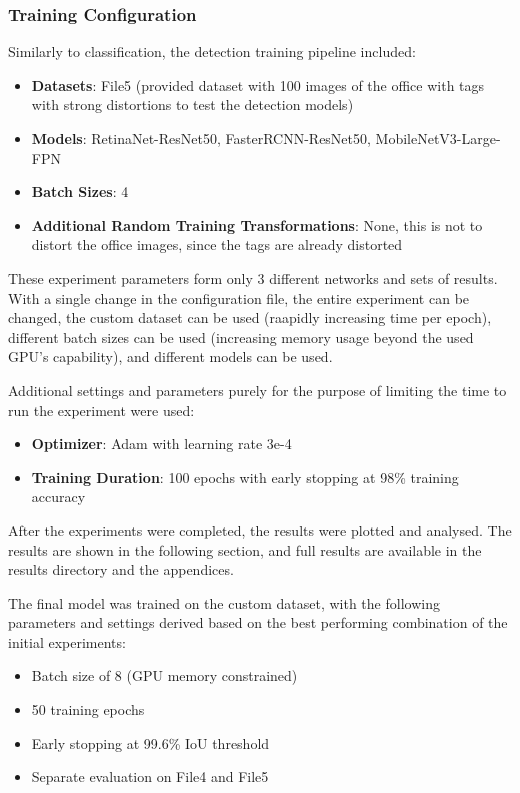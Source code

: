 \documentclass[conference]{IEEEtran}
\begin{document}
\subsubsection{Training Configuration}

Similarly to classification, the detection training pipeline included:

\begin{itemize}
  \item \textbf{Datasets}: File5 (provided dataset with 100 images of the office with tags with strong distortions to test the detection models)
  \item \textbf{Models}: RetinaNet-ResNet50, FasterRCNN-ResNet50, MobileNetV3-Large-FPN
  \item \textbf{Batch Sizes}: 4
  \item \textbf{Additional Random Training Transformations}: None, this is not to distort the office images, since the tags are already distorted
\end{itemize}

These experiment parameters form only 3 different networks and sets of results. 
With a single change in the configuration file, the entire experiment can be changed, the custom dataset can be used (raapidly increasing time per epoch), different
batch sizes can be used (increasing memory usage beyond the used GPU's capability), and different models can be used.

Additional settings and parameters purely for the purpose of limiting the time to run the experiment were used:

\begin{itemize}
    \item \textbf{Optimizer}: Adam with learning rate 3e-4
    \item \textbf{Training Duration}: 100 epochs with early stopping at 98\% training accuracy 
\end{itemize}

After the experiments were completed, the results were plotted and analysed. The results are shown in the following section, and full results are available in the results directory
and the appendices.

The final model was trained on the custom dataset, with the following parameters and settings derived based on the best performing combination of the initial experiments:

\begin{itemize}
  \item Batch size of 8 (GPU memory constrained)
  \item 50 training epochs
  \item Early stopping at 99.6\% IoU threshold
  \item Separate evaluation on File4 and File5
\end{itemize}
\end{document}
